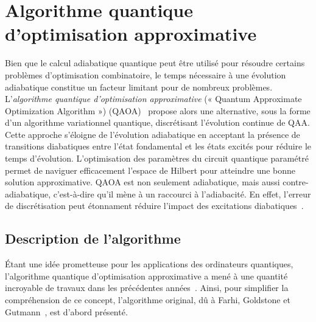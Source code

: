 
\section{Algorithme quantique d'optimisation approximative}
\label{sec:algorithme-quantique-d'optimisation-approximative}

Bien que le calcul adiabatique quantique peut être utilisé pour résoudre certains problèmes d'optimisation combinatoire, le temps nécessaire à une évolution adiabatique constitue un facteur limitant pour de nombreux problèmes. L'\textit{algorithme quantique d'optimisation approximative} (« Quantum Approximate Optimization Algorithm ») (QAOA)~\cite{farhiQuantumApproximateOptimization2014} propose alors une alternative, sous la forme d'un algorithme variationnel quantique, discrétisant l'évolution continue de QAA. Cette approche s'éloigne de l'évolution adiabatique en acceptant la présence de transitions diabatiques entre l'état fondamental et les états excités pour réduire le temps d'évolution. L'optimisation des paramètres du circuit quantique paramétré permet de naviguer efficacement l'espace de Hilbert pour atteindre une bonne solution approximative. QAOA est non seulement adiabatique, mais aussi contre-adiabatique, c'est-à-dire qu'il mène à un raccourci à l'adiabacité. En effet, l'erreur de discrétisation peut étonnament réduire l'impact des excitations diabatiques~\cite{wurtzCounterdiabaticityQuantumApproximate2022}.


\subsection{Description de l'algorithme}
\label{subsec:description-algorithme}

Étant une idée prometteuse pour les applications des ordinateurs quantiques, l'algorithme quantique d'optimisation approximative a mené à une quantité incroyable de travaux dans les précédentes années~\cite{zhouQuantumApproximateOptimization2020, blekosReviewQuantumApproximate2024}. Ainsi, pour simplifier la compréhension de ce concept, l'algorithme original, dû à Farhi, Goldstone et Gutmann~\cite{farhiQuantumApproximateOptimization2014}, est d'abord présenté.

